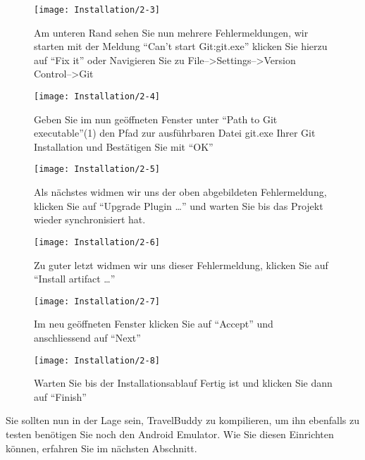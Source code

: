\begin{figure}
  \centering
  \begin{minipage}[b]{0.48\textwidth}
    \texttt{[image: Installation/2-3]}
    \caption{Am unteren Rand sehen Sie nun mehrere Fehlermeldungen, wir starten mit der Meldung ``Can't start Git:git.exe'' klicken Sie hierzu auf ``Fix it'' oder Navigieren Sie zu File-->Settings-->Version Control-->Git}
  \end{minipage}
  \hfill
  \begin{minipage}[b]{0.48\textwidth}
    \texttt{[image: Installation/2-4]}
    \caption{Geben Sie im nun geöffneten Fenster unter ``Path to Git executable''(1) den Pfad zur ausführbaren Datei git.exe Ihrer Git Installation und Bestätigen Sie mit ``OK''}
  \end{minipage}
\end{figure}

\begin{figure}
  \centering
  \begin{minipage}[b]{0.48\textwidth}
    \texttt{[image: Installation/2-5]}
    \caption{Als nächstes widmen wir uns der oben abgebildeten Fehlermeldung, klicken Sie auf ``Upgrade Plugin \ldots'' und warten Sie bis das Projekt wieder synchronisiert hat.}
  \end{minipage}
  \hfill
  \begin{minipage}[b]{0.48\textwidth}
    \texttt{[image: Installation/2-6]}
    \caption{Zu guter letzt widmen wir uns dieser Fehlermeldung, klicken Sie auf ``Install artifact \ldots''}
  \end{minipage}
\end{figure}

\begin{figure}
  \centering
  \begin{minipage}[b]{0.48\textwidth}
    \texttt{[image: Installation/2-7]}
    \caption{Im neu geöffneten Fenster klicken Sie auf ``Accept'' und anschliessend auf ``Next''}
  \end{minipage}
  \hfill
  \begin{minipage}[b]{0.48\textwidth}
    \texttt{[image: Installation/2-8]}
    \caption{Warten Sie bis der Installationsablauf Fertig ist und klicken Sie dann auf ``Finish''}
  \end{minipage}
\end{figure}

Sie sollten nun in der Lage sein, TravelBuddy zu kompilieren, um ihn ebenfalls zu testen benötigen Sie noch den Android Emulator. Wie Sie diesen Einrichten können, erfahren Sie im nächsten Abschnitt.

